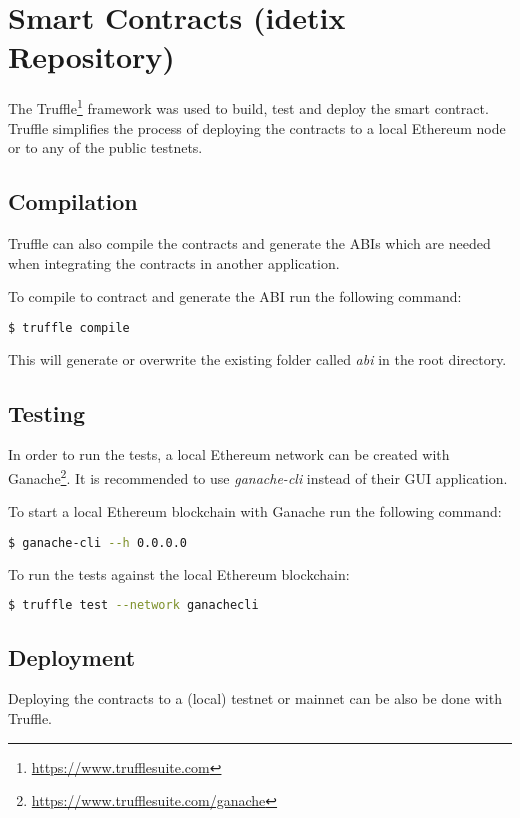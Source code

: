 \section{Smart Contracts (idetix Repository)}
The Truffle\footnote{\url{https://www.trufflesuite.com}} framework was used to build, test and deploy the smart contract. Truffle simplifies the process of deploying the contracts to a local Ethereum node or to any of the public testnets.

\subsection{Compilation}
Truffle can also compile the contracts and generate the ABIs which are needed when integrating the contracts in another application.

\noindent To compile to contract and generate the ABI run the following command:
\begin{lstlisting}[language=bash]
  $ truffle compile
\end{lstlisting}

This will generate or overwrite the existing folder called \textit{abi} in the root directory. 

\subsection{Testing}

In order to run the tests, a local Ethereum network can be created with Ganache\footnote{\url{https://www.trufflesuite.com/ganache}}. It is recommended to use \textit{ganache-cli} instead of their GUI application.

\noindent To start a local Ethereum blockchain with Ganache run the following command:
\begin{lstlisting}[language=bash]
  $ ganache-cli --h 0.0.0.0
\end{lstlisting}

\noindent To run the tests against the local Ethereum blockchain:
\begin{lstlisting}[language=bash]
  $ truffle test --network ganachecli
\end{lstlisting}

\subsection{Deployment}
Deploying the contracts to a (local) testnet or mainnet can be also be done with Truffle. 

